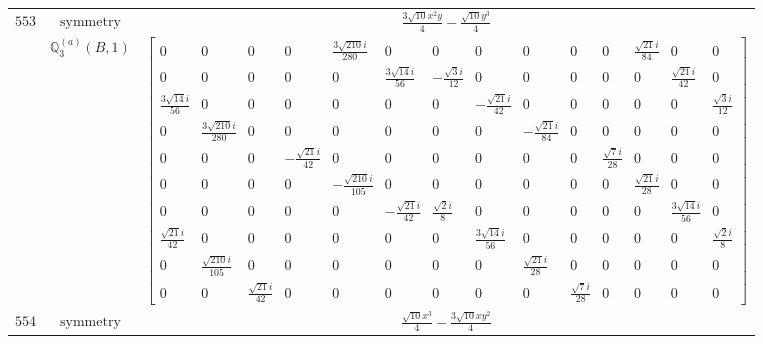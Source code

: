 \documentclass[fleqn,8pt,landscape]{jsarticle}
\begin{document}
\begin{longtable}{ccc}
$ 553 $ & $ \text{symmetry} $ & $ \frac{3 \sqrt{10} x^{2} y}{4} - \frac{\sqrt{10} y^{3}}{4} $ \\
$  $ & $ \mathbb{Q}_{3}^{(a)}(B,1) $ & $ \begin{bmatrix} 0 & 0 & 0 & 0 & \frac{3 \sqrt{210} i}{280} & 0 & 0 & 0 & 0 & 0 & 0 & \frac{\sqrt{21} i}{84} & 0 & 0 \\ 0 & 0 & 0 & 0 & 0 & \frac{3 \sqrt{14} i}{56} & - \frac{\sqrt{3} i}{12} & 0 & 0 & 0 & 0 & 0 & \frac{\sqrt{21} i}{42} & 0 \\ \frac{3 \sqrt{14} i}{56} & 0 & 0 & 0 & 0 & 0 & 0 & - \frac{\sqrt{21} i}{42} & 0 & 0 & 0 & 0 & 0 & \frac{\sqrt{3} i}{12} \\ 0 & \frac{3 \sqrt{210} i}{280} & 0 & 0 & 0 & 0 & 0 & 0 & - \frac{\sqrt{21} i}{84} & 0 & 0 & 0 & 0 & 0 \\ 0 & 0 & 0 & - \frac{\sqrt{21} i}{42} & 0 & 0 & 0 & 0 & 0 & 0 & \frac{\sqrt{7} i}{28} & 0 & 0 & 0 \\ 0 & 0 & 0 & 0 & - \frac{\sqrt{210} i}{105} & 0 & 0 & 0 & 0 & 0 & 0 & \frac{\sqrt{21} i}{28} & 0 & 0 \\ 0 & 0 & 0 & 0 & 0 & - \frac{\sqrt{21} i}{42} & \frac{\sqrt{2} i}{8} & 0 & 0 & 0 & 0 & 0 & \frac{3 \sqrt{14} i}{56} & 0 \\ \frac{\sqrt{21} i}{42} & 0 & 0 & 0 & 0 & 0 & 0 & \frac{3 \sqrt{14} i}{56} & 0 & 0 & 0 & 0 & 0 & \frac{\sqrt{2} i}{8} \\ 0 & \frac{\sqrt{210} i}{105} & 0 & 0 & 0 & 0 & 0 & 0 & \frac{\sqrt{21} i}{28} & 0 & 0 & 0 & 0 & 0 \\ 0 & 0 & \frac{\sqrt{21} i}{42} & 0 & 0 & 0 & 0 & 0 & 0 & \frac{\sqrt{7} i}{28} & 0 & 0 & 0 & 0 \end{bmatrix} $ \\ \hline
$ 554 $ & $ \text{symmetry} $ & $ \frac{\sqrt{10} x^{3}}{4} - \frac{3 \sqrt{10} x y^{2}}{4} $ \\

\end{longtable}
\end{document}
